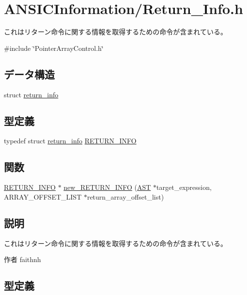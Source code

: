 \section{ANSICInformation/Return\_\-Info.h}
\label{Return__Info_8h}


これはリターン命令に関する情報を取得するための命令が含まれている。  


{\ttfamily \#include \char`\"{}PointerArrayControl.h\char`\"{}}\par
\subsection*{データ構造}
\begin{DoxyCompactItemize}
\item 
struct \hyperlink{structreturn__info}{return\_\-info}
\end{DoxyCompactItemize}
\subsection*{型定義}
\begin{DoxyCompactItemize}
\item 
typedef struct \hyperlink{structreturn__info}{return\_\-info} \hyperlink{Return__Info_8h_a47fbc30788666354ae6600d608a8d551}{RETURN\_\-INFO}
\end{DoxyCompactItemize}
\subsection*{関数}
\begin{DoxyCompactItemize}
\item 
\hyperlink{structreturn__info}{RETURN\_\-INFO} $\ast$ \hyperlink{Return__Info_8h_a4830d2ad27d026fbb9e45ab93ceb221c}{new\_\-RETURN\_\-INFO} (\hyperlink{structabstract__syntax__tree}{AST} $\ast$target\_\-expression, ARRAY\_\-OFFSET\_\-LIST $\ast$return\_\-array\_\-offset\_\-list)
\end{DoxyCompactItemize}


\subsection{説明}
これはリターン命令に関する情報を取得するための命令が含まれている。 \begin{DoxyAuthor}{作者}
faithnh 
\end{DoxyAuthor}


\subsection{型定義}
